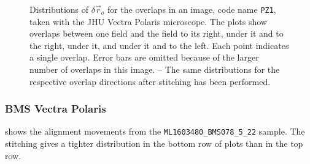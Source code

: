 \documentclass{article}
\begin{document}
\begin{figure}[ht]
\begin{subfigure}{0.24\linewidth}
		\caption{}
		\label{fig:stitchresultJHUPolaris1}
	\end{subfigure}
	\caption{Distributions of $\delta\vec{r}_o$ for the overlaps in an image, code name \texttt{PZ1}, taken with the JHU Vectra Polaris microscope.  The plots show overlaps between one field and the field  to its right,  under it and to the right,  under it, and  under it and to the left.  Each point indicates a single overlap.  Error bars are omitted because of the larger number of overlaps in this image.  -- The same distributions for the respective overlap directions after stitching has been performed.}
	\label{fig:alignmentresultsJHUPolaris}
\end{figure}

\subsubsection{BMS Vectra Polaris}

 shows the alignment movements from the \texttt{ML1603480\_BMS078\_5\_22} sample.  The stitching gives a tighter distribution in the bottom row of plots than in the top row.
\end{document}
